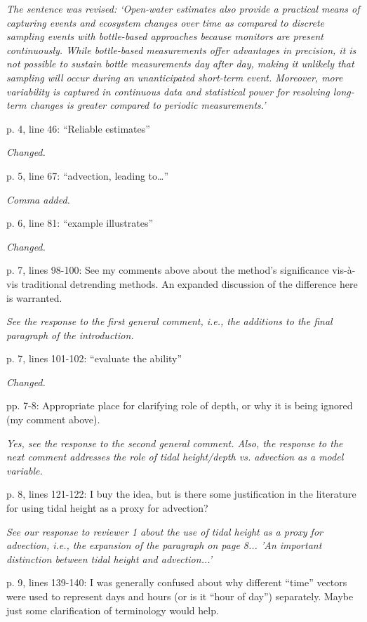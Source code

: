 \documentclass[letterpaper,12pt]{article}\usepackage[]{graphicx}\usepackage[]{color}
\begin{document}
{\it The sentence was revised: `Open-water estimates also provide a practical means of capturing events and ecosystem changes over time as compared to discrete sampling events with bottle-based approaches because monitors are present continuously.  While bottle-based measurements offer advantages in precision, it is not possible to sustain bottle measurements day after day, making it unlikely that sampling will occur during an unanticipated short-term event.  Moreover, more variability is captured in continuous data and statistical power for resolving long-term changes is greater compared to periodic measurements.'}

p. 4, line 46: “Reliable estimates”

{\it Changed.}

p. 5, line 67: “advection, leading to…”

{\it Comma added.}

p. 6, line 81: “example illustrates”

{\it Changed.}

p. 7, lines 98-100: See my comments above about the method’s significance vis-à-vis traditional detrending methods. An expanded discussion of the difference here is warranted.

{\it See the response to the first general comment, i.e., the additions to the final paragraph of the introduction.}

p. 7, lines 101-102: “evaluate the ability”

{\it Changed.}

pp. 7-8: Appropriate place for clarifying role of depth, or why it is being ignored (my comment above).

{\it Yes, see the response to the second general comment.  Also, the response to the next comment addresses the role of tidal height/depth vs. advection as a model variable.}

p. 8, lines 121-122: I buy the idea, but is there some justification in the literature for using tidal height as a proxy for advection?

{\it See our response to reviewer 1 about the use of tidal height as a proxy for advection, i.e., the expansion of the paragraph on page 8... 'An important distinction between tidal height and advection...'}

p. 9, lines 139-140: I was generally confused about why different “time” vectors were used to represent days and hours (or is it “hour of day”) separately. Maybe just some clarification of terminology would help.
\end{document}
